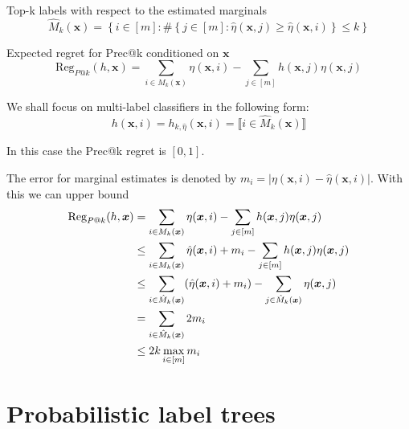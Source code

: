 \documentclass{article}
\renewcommand{\vec}[1]{\boldsymbol{#1}}
\newcommand{\bx}{\vec{x}}
\newcommand{\assert}[1]{\llbracket #1 \rrbracket}
\begin{document}
Top-k labels with respect to the estimated marginals
\[
\hat{M}_k(\bx) = \left\{ i\in [m] : \# \left\{ j \in [m] : \hat{\eta}(\bx, j) \ge \hat{\eta}(\bx, i)  \right\} \le k\right\}
\]


Expected regret for Prec@k conditioned on $\bx$ 
\[
\mbox{Reg}_{P@k} (h, \bx) = \sum_{i \in M_k(\bx)} \eta (\bx ,i ) - \sum_{j \in [m]} h(\bx, j) \eta(\bx , j )
\]

We shall focus on multi-label classifiers in the following form:
\[
h(\bx,i) =h_{k, \hat{\eta}}(\bx,i) = \assert{\textstyle i \in \hat{M}_k(\bx) }
\]

In this case the Prec@k regret is $[0,1]$.

The error for marginal estimates is denoted by $m_i = \vert \eta (\bx ,i ) - \hat{\eta} (\bx ,i )\vert$. With this we can upper bound 
\begin{align}
\mbox{Reg}_{P@k} (h, \bx) 
  & = \sum_{i \in M_k(\bx)} \eta (\bx ,i ) - \sum_{j \in [m]} h(\bx, j) \eta(\bx , j ) \notag \\
  & \le \sum_{i \in M_k(\bx)} \hat{\eta} (\bx ,i ) + m_i - \sum_{j \in [m]} h(\bx, j) \eta(\bx , j ) \notag \\ 
  & \le \sum_{i \in \hat{M}_k(\bx)} (\hat{\eta} (\bx ,i ) + m_i )- \sum_{j \in \hat{M}_k(\bx)}  \eta(\bx , j ) \notag \\
  & = \sum_{i \in \hat{M}_k(\bx)} 2m_i \notag \\
  & \le 2k\max_{i \in [m]} m_i
\end{align}

\section{Probabilistic label trees}
\label{app:plt}
\end{document}
